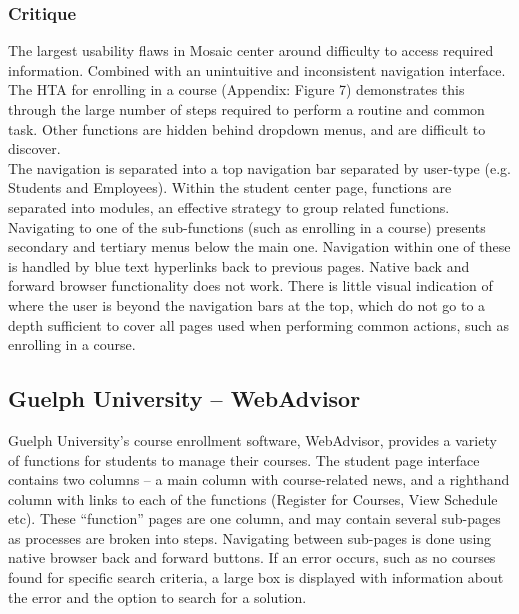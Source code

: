 \documentclass[10pt]{article}
\begin{document}
\begin{multicols}{2}
\subsubsection*{Critique}
The largest usability flaws in Mosaic center around difficulty to access 
required information. Combined with an unintuitive and inconsistent navigation 
interface. The HTA for enrolling in a course (Appendix: Figure 7) demonstrates this 
through the large number of steps required to perform a routine and common task. 
Other functions are hidden behind dropdown menus, and are difficult to discover.\\

The navigation is separated into a top navigation bar separated by user-type 
(e.g. Students and Employees). Within the student center page, functions are 
separated into modules, an effective strategy to group related functions. 
Navigating to one of the sub-functions (such as enrolling in a course) presents 
secondary and tertiary menus below the main one. Navigation within one of these 
is handled by blue text hyperlinks back to previous pages. Native back and 
forward browser functionality does not work. There is little visual indication 
of where the user is beyond the navigation bars at the top, which do not go to a 
depth sufficient to cover all pages used when performing common actions, such as 
enrolling in a course.

\subsection*{Guelph University -- WebAdvisor}
Guelph University's course enrollment software, WebAdvisor, provides a variety 
of functions for students to manage their courses. The student page interface 
contains two columns -- a main column with course-related news, and a righthand 
column with links to each of the functions (Register for Courses, View Schedule 
etc). These ``function'' pages are one column, and may contain several sub-pages 
as processes are broken into steps. Navigating between sub-pages is done using 
native browser back and forward buttons. If an error occurs, such as no courses 
found for specific search criteria, a large box is displayed with information 
about the error and the option to search for a solution.


\end{multicols}
\end{document}
